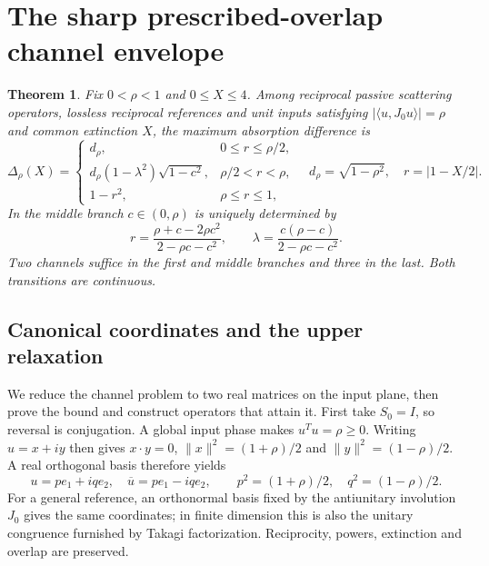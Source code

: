 \documentclass[11pt,a4paper]{article}
\newtheorem{theorem}{Theorem}[section]
\theoremstyle{remark}
\newcommand{\norm}[1]{\lVert #1\rVert}
\newcommand{\abs}[1]{\lvert #1\rvert}
\newcommand{\ip}[2]{\langle #1,#2\rangle}
\begin{document}
\section{The sharp prescribed-overlap channel envelope}\label{sec:joint}
\begin{theorem}\label{thm:joint}
Fix $0<\rho<1$ and $0\leq X\leq4$. Among reciprocal passive scattering operators, lossless reciprocal references and unit inputs satisfying $\abs{\ip u{J_0u}}=\rho$ and common extinction $X$, the maximum absorption difference is
\begin{equation}\label{eq:joint}
 \Delta_\rho(X)=
 \begin{cases}
 d_\rho,&0\leq r\leq\rho/2,\\
 d_\rho(1-\lambda^2)\sqrt{1-c^2},&\rho/2<r<\rho,\\
 1-r^2,&\rho\leq r\leq1,
 \end{cases}
 \quad d_\rho=\sqrt{1-\rho^2},\quad r=\abs{1-X/2}.
\end{equation}
In the middle branch $c\in(0,\rho)$ is uniquely determined by
\begin{equation}\label{eq:middle-parameters}
 r=\frac{\rho+c-2\rho c^2}{2-\rho c-c^2},\qquad
 \lambda=\frac{c(\rho-c)}{2-\rho c-c^2}.
\end{equation}
Two channels suffice in the first and middle branches and three in the last. Both transitions are continuous.
\end{theorem}

\subsection{Canonical coordinates and the upper relaxation}
We reduce the channel problem to two real matrices on the input plane, then prove the bound and construct operators that attain it. First take $S_0=I$, so reversal is conjugation. A global input phase makes $u^Tu=\rho\geq0$. Writing $u=x+iy$ then gives $x\cdot y=0$, $\norm x^2=(1+\rho)/2$ and $\norm y^2=(1-\rho)/2$. A real orthogonal basis therefore yields
\[
 u=pe_1+iqe_2,\quad \overline u=pe_1-iqe_2,\qquad
 p^2=(1+\rho)/2,\quad q^2=(1-\rho)/2.
\]
For a general reference, an orthonormal basis fixed by the antiunitary involution $J_0$ gives the same coordinates; in finite dimension this is also the unitary congruence furnished by Takagi factorization. Reciprocity, powers, extinction and overlap are preserved.
\end{document}
